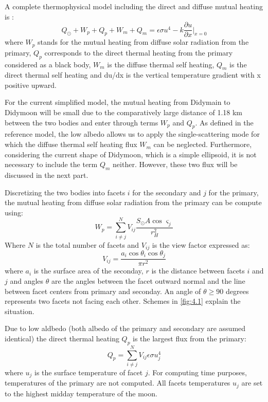 A complete thermophysical model including the direct and diffuse mutual heating is \citep{pelivan}:
\begin{equation}
    Q_\odot+W_p+Q_p+W_m+Q_m=\epsilon\sigma u^4-k\frac{\partial{u}}{\partial{x}}\Big|_{x=0}
    \label{eq:4.1}
\end{equation}
where $W_p$ stands for the mutual heating from diffuse solar radiation from the primary, $Q_p$ corresponds to the direct thermal heating from the primary considered as a black body, $W_m$ is the diffuse thermal self heating, $Q_m$ is the direct thermal self heating and du/dx is the vertical temperature gradient with x positive upward.

For the current simplified model, the mutual heating from Didymain to Didymoon will be small due to the comparatively large distance of 1.18 km \citep{model} between the two bodies and enter through terms $W_p$ and $Q_p$. As defined in the reference model, the low albedo allows us to apply the single-scattering mode for which the diffuse thermal self heating flux $W_m$ can be neglected. Furthermore, considering the current shape of Didymoon, which is a simple ellipsoid, it is not necessary to include the term $Q_m$ neither. However, these two flux will be discussed in the next part.

Discretizing the two bodies into facets $i$ for the secondary and $j$ for the primary, the mutual heating from diffuse solar radiation from the primary can be compute using:
\begin{equation}
    W_p=\sum_{i\neq j}^N V_{ij}\frac{S_{\odot}A\cos\varsigma_j}{r_H^2}
    \label{eq:4.2}
\end{equation}
Where $N$ is the total number of facets and $V_{ij}$ is the view factor expressed as:
\begin{equation}
    V_{ij}=\frac{a_i\cos\theta_i\cos\theta_j}{\pi r^2}
    \label{eq:4.3}
\end{equation}
where $a_i$ is the surface area of the seconday, $r$ is the distance between facets $i$ and $j$ and angles $\theta$ are the angles between the facet outward normal and the line between facet centers from primary and seconday. An angle of $\theta\geq90$ degrees represents two facets not facing each other. Schemes in \autoref{fig:4.1} explain the situation.

Due to low aldbedo (both albedo of the primary and secondary are assumed identical) the direct thermal heating $Q_p$ is the largest flux from the primary:
\begin{equation}
    Q_p=\sum_{i\neq j}^N V_{ij}\epsilon\sigma u^4_{j}
    \label{eq:4.4}
\end{equation}
where $u_{j}$ is the surface temperature of facet $j$. For computing time purposes, temperatures of the primary are not computed. All facets temperatures $u_{j}$ are set to the highest midday temperature of the moon. 

